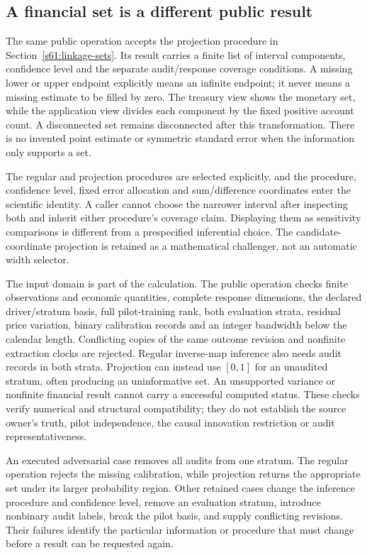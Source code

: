 \subsection{A financial set is a different public result}
\label{s61:projection-product}
The same public operation accepts the projection procedure in
Section~\ref{s61:linkage-sets}. Its result carries a finite list of interval
components, confidence level and the separate audit/response coverage
conditions. A missing lower or upper endpoint explicitly means an infinite
endpoint; it never means a missing estimate to be filled by zero. The treasury
view shows the monetary set, while the application view divides each
component by the fixed positive account count. A disconnected set remains
disconnected after this transformation. There is no invented point estimate
or symmetric standard error when the information only supports a set.

The regular and projection procedures are selected explicitly, and the
procedure, confidence level, fixed error allocation and sum/difference
coordinates enter the scientific identity. A caller cannot choose the
narrower interval after inspecting both and inherit either procedure's
coverage claim. Displaying them as sensitivity comparisons is different
from a prespecified inferential choice. The candidate-coordinate projection
is retained as a mathematical challenger, not an automatic width selector.

The input domain is part of the calculation. The public operation checks
finite observations and economic quantities, complete response dimensions,
the declared driver/stratum basis, full pilot-training rank, both evaluation
strata, residual price variation, binary calibration records and an integer
bandwidth below the calendar length. Conflicting copies of the same outcome
revision and nonfinite extraction clocks are rejected. Regular inverse-map
inference also needs audit records in both strata. Projection can instead
use $[0,1]$ for an unaudited stratum, often producing an uninformative set.
An unsupported variance or nonfinite financial result cannot carry a
successful computed status. These checks verify numerical and structural
compatibility; they do not establish the source owner's truth, pilot
independence, the causal innovation restriction or audit representativeness.

An executed adversarial case removes all audits from one stratum. The regular
operation rejects the missing calibration, while projection returns the
appropriate set under its larger probability region. Other retained cases
change the inference procedure and confidence level, remove an evaluation
stratum, introduce nonbinary audit labels, break the pilot basis, and supply
conflicting revisions. Their failures identify the particular information
or procedure that must change before a result can be requested again.
